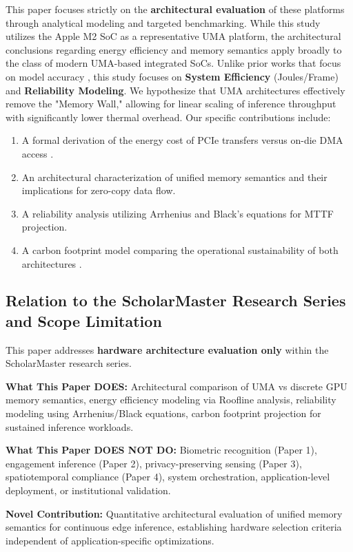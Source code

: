 \documentclass[conference]{IEEEtran}
\begin{document}
This paper focuses strictly on the \textbf{architectural evaluation} of these platforms through analytical modeling and targeted benchmarking. While this study utilizes the Apple M2 SoC as a representative UMA platform, the architectural conclusions regarding energy efficiency and memory semantics apply broadly to the class of modern UMA-based integrated SoCs. Unlike prior works that focus on model accuracy \cite{b11}, this study focuses on \textbf{System Efficiency} (Joules/Frame) and \textbf{Reliability Modeling}. We hypothesize that UMA architectures effectively remove the "Memory Wall," allowing for linear scaling of inference throughput with significantly lower thermal overhead. Our specific contributions include:
\begin{enumerate}
    \item A formal derivation of the energy cost of PCIe transfers versus on-die DMA access \cite{b8, b1}.
    \item An architectural characterization of unified memory semantics and their implications for zero-copy data flow.
    \item A reliability analysis utilizing Arrhenius and Black's equations for MTTF projection.
    \item A carbon footprint model comparing the operational sustainability of both architectures \cite{b12}.
\end{enumerate}

\subsection{Relation to the ScholarMaster Research Series and Scope Limitation}

This paper addresses \textbf{hardware architecture evaluation only} within the ScholarMaster research series.

\textbf{What This Paper DOES:}
Architectural comparison of UMA vs discrete GPU memory semantics, energy efficiency modeling via Roofline analysis, reliability modeling using Arrhenius/Black equations, carbon footprint projection for sustained inference workloads.

\textbf{What This Paper DOES NOT DO:}
Biometric recognition (Paper 1), engagement inference (Paper 2), privacy-preserving sensing (Paper 3), spatiotemporal compliance (Paper 4), system orchestration, application-level deployment, or institutional validation.

\textbf{Novel Contribution:} Quantitative architectural evaluation of unified memory semantics for continuous edge inference, establishing hardware selection criteria independent of application-specific optimizations.
\end{document}
